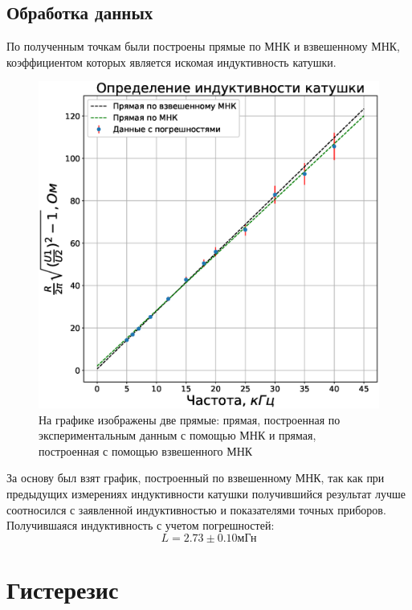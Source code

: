 \documentclass[a4paper,14pt]{extarticle}
\begin{document}
		\subsection{Обработка данных}
			По полученным точкам были построены прямые по МНК и взвешенному МНК, коэффициентом которых является искомая индуктивность катушки.
			\begin{figure}[h]
				\centering
				\includegraphics[width=.80\linewidth]{Lab2_1.eps}
				\caption{На графике изображены две прямые: прямая, построенная по экспериментальным данным с помощью МНК и прямая, построенная с помощью взвешенного МНК}
				\label{fig2}
			\end{figure} 
			\newpage
			За основу был взят график, построенный по взвешенному МНК, так как при предыдущих измерениях индуктивности катушки получившийся результат лучше соотносился с заявленной индуктивностью и показателями точных приборов. Получившаяся индуктивность с учетом погрешностей:
			\begin{equation}
				L = 2.73 \pm 0.10\text{мГн}
			\end{equation}
	\section{Гистерезис}
\end{document}
